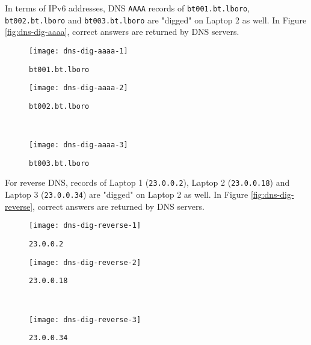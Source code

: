 In terms of IPv6 addresses, DNS \texttt{AAAA} records of \texttt{bt001.bt.lboro}, \texttt{bt002.bt.lboro} and \texttt{bt003.bt.lboro} are "digged" on Laptop 2 as well. In Figure \ref{fig:dns-dig-aaaa}, correct answers are returned by DNS servers.

\begin{figure*}[ht!]
    \centering
    \begin{subfigure}[b]{0.67\textwidth}
        \centering
        \texttt{[image: dns-dig-aaaa-1]}
        \caption{\texttt{bt001.bt.lboro}}
    \end{subfigure}
    \hfill
    \begin{minipage}[b]{0.3\textwidth}
	    \begin{subfigure}[b]{\linewidth}
	        \centering
	        \texttt{[image: dns-dig-aaaa-2]}
	        \caption{\texttt{bt002.bt.lboro}}
	    \end{subfigure}
	    \\
	    \begin{subfigure}[b]{\linewidth}
	        \centering
	        \texttt{[image: dns-dig-aaaa-3]}
	        \caption{\texttt{bt003.bt.lboro}}
	    \end{subfigure}
	\end{minipage}
    \caption{Querying DNS \texttt{AAAA} Records for sub-domains of \texttt{bt.lboro} on Laptop 2.}
    \label{fig:dns-dig-aaaa}
\end{figure*}


For reverse DNS, records of Laptop 1 (\texttt{23.0.0.2}), Laptop 2 (\texttt{23.0.0.18}) and Laptop 3 (\texttt{23.0.0.34}) are "digged" on Laptop 2 as well. In Figure \ref{fig:dns-dig-reverse}, correct answers are returned by DNS servers.


\begin{figure*}[ht!]
    \centering
    \begin{subfigure}[b]{0.67\textwidth}
        \centering
        \texttt{[image: dns-dig-reverse-1]}
        \caption{\texttt{23.0.0.2}}
    \end{subfigure}
    \hfill
    \begin{minipage}[b]{0.3\textwidth}
	    \begin{subfigure}[b]{\linewidth}
	        \centering
	        \texttt{[image: dns-dig-reverse-2]}
	        \caption{\texttt{23.0.0.18}}
	    \end{subfigure}
	    \\
	    \begin{subfigure}[b]{\linewidth}
	        \centering
	        \texttt{[image: dns-dig-reverse-3]}
	        \caption{\texttt{23.0.0.34}}
	    \end{subfigure}
	\end{minipage}
    \caption{Querying Reverse DNS Records for All $3$ Laptops on Laptop 2.}
    \label{fig:dns-dig-reverse}
\end{figure*}


